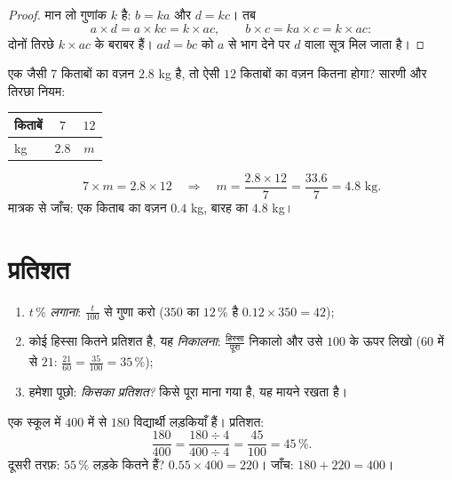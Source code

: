 \begin{proof}
मान लो गुणांक $k$ है: $b = ka$ और $d = kc$। तब
\[
a \times d = a \times kc = k \times ac,
\qquad
b \times c = ka \times c = k \times ac :
\]
दोनों तिरछे  $k \times ac$ के बराबर हैं। $ad = bc$ को $a$ से
भाग देने पर $d$ वाला सूत्र मिल जाता है।
\end{proof}

\begin{example}[चौथा समानुपाती]\label{ex:g7:prop:fourth}
एक जैसी $7$ किताबों का वज़न $2.8$ kg है, तो ऐसी $12$ किताबों का
वज़न कितना होगा? सारणी और तिरछा नियम:
\begin{center}
\renewcommand{\arraystretch}{1.3}
\begin{tabular}{l|cc}
किताबें & $7$ & $12$ \\
\hline
kg & $2.8$ & $m$ \\
\end{tabular}
\end{center}
\[
7 \times m = 2.8 \times 12
\quad\Longrightarrow\quad
m = \frac{2.8 \times 12}{7} = \frac{33.6}{7} = 4.8 \text{ kg}.
\]
मात्रक से जाँच: एक किताब का वज़न $0.4$ kg, बारह का $4.8$ kg।
\end{example}

\section{प्रतिशत}

\begin{method}[प्रतिशत लगाना और निकालना]\label{met:g7:prop:percent}
\begin{enumerate}
  \item $t\,\%$ \emph{लगाना}: $\frac{t}{100}$ से गुणा करो
        ($350$ का $12\,\%$ है $0.12 \times 350 = 42$);
  \item कोई हिस्सा कितने प्रतिशत है, यह \emph{निकालना}:
        $\frac{\text{हिस्सा}}{\text{पूरा}}$ निकालो और उसे $100$ के
        ऊपर लिखो ($60$ में से $21$:
        $\frac{21}{60} = \frac{35}{100} = 35\,\%$);
  \item हमेशा पूछो: \emph{किसका प्रतिशत?} किसे पूरा माना गया है,
        यह मायने रखता है।
\end{enumerate}
\end{method}

\begin{example}\label{ex:g7:prop:percent}
एक स्कूल में $400$ में से $180$ विद्यार्थी लड़कियाँ हैं। प्रतिशत:
\[
\frac{180}{400} = \frac{180 \div 4}{400 \div 4} = \frac{45}{100}
= 45\,\% .
\]
दूसरी तरफ़: $55\,\%$ लड़के कितने हैं? $0.55 \times 400 = 220$।
जाँच: $180 + 220 = 400$।
\end{example}

